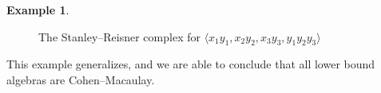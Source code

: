 \documentclass[10pt]{amsart}
\numberwithin{equation}{section}
\theoremstyle{definition}
\newtheorem{ex}[thm]{Example}
\theoremstyle{remark}
\newcommand{\1}{^{-1}}
\newcommand{\la}{\langle}
\newcommand{\ra}{\rangle}
\begin{document}
\begin{ex}
\begin{figure}
%                    
%	
%	
\caption{The Stanley--Reisner complex for $\la x_1y_1, x_2y_2, x_3y_3, y_1y_2y_3 \ra$}
\label{fig:3vertexball}
\end{figure}
\end{ex}

This example generalizes, and we are able to conclude that all lower bound algebras are Cohen--Macaulay. 
\end{document}
